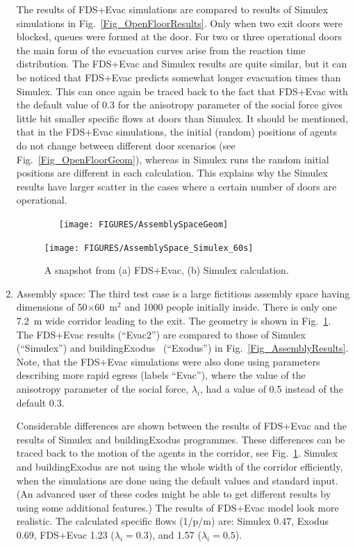 \documentclass[12pt,a4paper,final,twoside]{stylevk}
\begin{document}
\begin{enumerate}
  The results of FDS+Evac simulations are compared to results of
  Simulex simulations in Fig.~\ref{Fig_OpenFloorResults}.  Only when
  two exit doors were blocked, queues were formed at the door.  For
  two or three operational doors the main form of the evacuation
  curves arise from the reaction time distribution.  The FDS+Evac and
  Simulex results are quite similar, but it can be noticed that
  FDS+Evac predicts somewhat longer evacuation times than Simulex.
  This can once again be traced back to the fact that FDS+Evac with
  the default value of 0.3 for the anisotropy parameter of the social
  force gives little bit smaller specific flows at doors than Simulex.
  It should be mentioned, that in the FDS+Evac simulations, the
  initial (random) positions of agents do not change between different
  door scenarios (see Fig.~\ref{Fig_OpenFloorGeom}), whereas in
  Simulex runs the random initial positions are different in each
  calculation.  This explains why the Simulex results have larger
  scatter in the cases where a certain number of doors are
  operational.\vspace{\fill}


%
\begin{figure}[!tb]
  \centerline{~~~\texttt{[image: FIGURES/AssemblySpaceGeom]}} 
  \centerline{\texttt{[image: FIGURES/AssemblySpace\_Simulex\_60s]}} 
  \caption{A snapshot from (a) FDS+Evac, (b) Simulex
    calculation.}\label{Fig_AssemblySnapshots} 
\end{figure}
%

\pagebreak[3]
%
\item Assembly space: The third test case is a large fictitious
  assembly space having dimensions of 50$\times$60~$\mathrm{m^2}$ and
  1000 people initially inside.  There is only one 7.2~m wide corridor
  leading to the exit.  The geometry is shown in
  Fig.~\ref{Fig_AssemblySnapshots}.  The FDS+Evac results (``Evac2'')
  are compared to those of Simulex (``Simulex'') and
  buildingExodus~\cite{Exodus3} (``Exodus'') in
  Fig.~\ref{Fig_AssemblyResults}.  Note, that the FDS+Evac simulations
  were also done using parameters describing more rapid egress
  (labels ``Evac''), where the value of the anisotropy
  parameter of the social force, $\lambda_i$, had a value of 0.5
  instead of the default 0.3.
  
  Considerable differences are shown between the results of FDS+Evac
  and the results of Simulex and buildingExodus programmes.  These
  differences can be traced back to the motion of the agents in the
  corridor, see Fig.~\ref{Fig_AssemblySnapshots}.  Simulex and
  buildingExodus are not using the whole width of the corridor
  efficiently, when the simulations are done using the default values
  and standard input.  (An advanced user of these codes might be able
  to get different results by using some additional features.)  The
  results of FDS+Evac model look more realistic.  The calculated
  specific flows (1/p/m) are: Simulex 0.47, Exodus 0.69, FDS+Evac 1.23
  ($\lambda_i=0.3$), and 1.57 ($\lambda_i=0.5$).
  

\end{enumerate}
\end{document}
